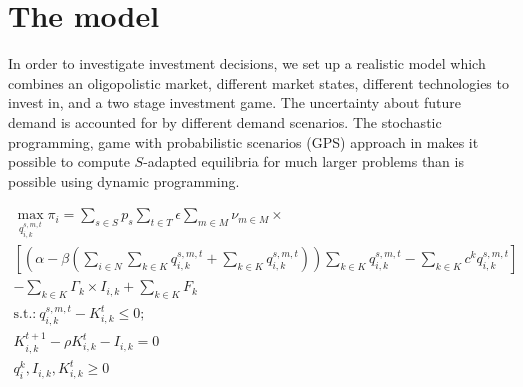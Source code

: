 \section{The model}


In order to investigate investment decisions, we set up a realistic model which combines an oligopolistic market, different market states, different technologies to invest in, and a two stage investment game. The uncertainty about future demand is accounted for by different demand scenarios. The stochastic programming, game with probabilistic scenarios (GPS) approach in \cite{Genc2007} makes it possible to compute $S$-adapted equilibria for much larger problems than is possible using dynamic programming.

\begin{gather}
	\max_{q_{i,k}^{s,m,t}} \pi_i=  \sum_{s\in S} p_s \sum_{t\in T} \epsilon \sum_{m\in M} \nu_{m\in M} \times \\ \nonumber 
	\left[\left(\alpha-\beta\left(\sum_{i\in N} \sum_{k\in K} q_{i,k}^{s,m,t}+\sum_{k\in K}q_{i,k}^{s,m,t}\right)\right) \sum_{k\in K} q_{i,k}^{s,m,t} - \sum_{k\in K}c^k q_{i,k}^{s,m,t} \right] \\ \nonumber 
	- \sum_{k\in K}\Gamma_k \times I_{i,k} + \sum_{k\in K} F_k \\ \nonumber
	\text{s.t.:} \  q_{i,k}^{s,m,t}-K_{i,k}^t \leq 0; \\  \nonumber
											K^{t+1}_{i,k} - \rho K_{i,k}^t - I_{i,k} = 0 \\ \nonumber
 										  q_i^k, I_{i,k}, K_{i,k}^t	\geq 0  \nonumber
	\end{gather}
	
